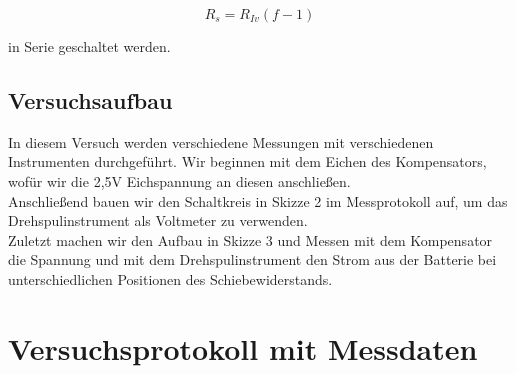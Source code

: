 \documentclass{article}
\begin{document}
\begin{equation}
    R_s = R_{Iv}(f-1)
\end{equation}

in Serie geschaltet werden.

\subsection{Versuchsaufbau}

In diesem Versuch werden verschiedene Messungen mit verschiedenen Instrumenten durchgeführt. Wir beginnen mit dem Eichen des Kompensators, wofür wir die 2,5V Eichspannung an diesen anschließen. \\
Anschließend bauen wir den Schaltkreis in Skizze 2 im Messprotokoll auf, um das Drehspulinstrument als Voltmeter zu verwenden. \\
Zuletzt machen wir den Aufbau in Skizze 3 und Messen mit dem Kompensator die Spannung und mit dem Drehspulinstrument den Strom aus der Batterie bei unterschiedlichen Positionen des Schiebewiderstands. 


\newpage

\section{Versuchsprotokoll mit Messdaten}
\end{document}
